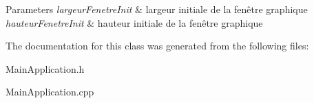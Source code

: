 \begin{DoxyParams}{Parameters}
{\em largeur\+Fenetre\+Init} & largeur initiale de la fenêtre graphique \\
\hline
{\em hauteur\+Fenetre\+Init} & hauteur initiale de la fenêtre graphique \\
\hline
\end{DoxyParams}


The documentation for this class was generated from the following files\+:\begin{DoxyCompactItemize}
\item 
Main\+Application.\+h\item 
Main\+Application.\+cpp\end{DoxyCompactItemize}
